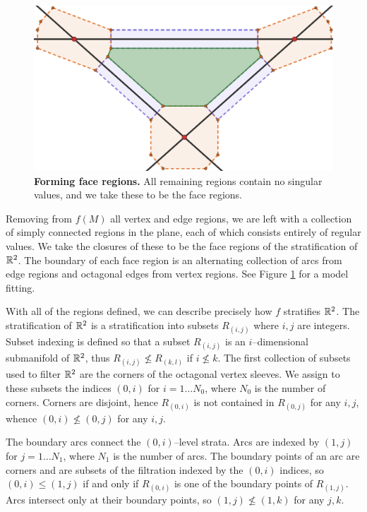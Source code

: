 \begin{figure}[h!]
	\centering
	\includegraphics[width=\textwidth]{figures/face-sleeve.png}
	\caption{
		\textbf{Forming face regions.}
		All remaining regions contain no singular values, and we take these to be the face regions.
	}
	\label{fig:face-sleeve}
\end{figure}

Removing from $f(M)$ all vertex and edge regions, we are left with a collection of simply connected regions in the plane, each of which consists entirely of regular values.
We take the closures of these to be the face regions of the stratification of $\mathbb{R}^2$.
The boundary of each face region is an alternating collection of arcs from edge regions and octagonal edges from vertex regions.
See Figure \ref{fig:face-sleeve} for a model fitting.

With all of the regions defined, we can describe precisely how $f$ stratifies $\mathbb{R}^2$.
The stratification of $\mathbb{R}^2$ is a stratification into subsets $R_{(i,j)}$ where $i,j$ are integers.
Subset indexing is defined so that a subset $R_{(i,j)}$ is an $i$--dimensional submanifold of $\mathbb{R}^2$, thus $R_{(i,j)}\nleq R_{(k,l)}$ if $i\nleq k$.
The first collection of subsets used to filter $\mathbb{R}^2$ are the corners of the octagonal vertex sleeves.
We assign to these subsets the indices $(0,i)$ for $i=1\dots N_0$, where $N_0$ is the number of corners.
Corners are disjoint, hence $R_{(0,i)}$ is not contained in $R_{(0,j)}$ for any $i, j$, whence $(0,i)\nleq (0,j)$ for any $i,j$.

The boundary arcs connect the $(0,i)$--level strata.
Arcs are indexed by $(1,j)$ for $j=1\dots N_1$, where $N_1$ is the number of arcs.
The boundary points of an arc are corners and are subsets of the filtration indexed by the $(0,i)$ indices, so $(0,i)\leq (1,j)$ if and only if $R_{(0,i)}$ is one of the boundary points of $R_{(1,j)}$.
Arcs intersect only at their boundary points, so $(1,j)\nleq(1,k)$ for any $j,k$. 

